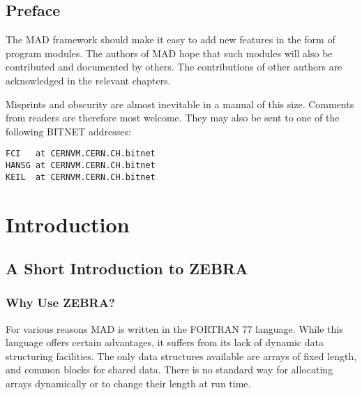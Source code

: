 
\chapter*{Preface}
 
The MAD framework should make it easy to add new features
in the form of program modules.
The authors of MAD hope that such modules will also be contributed
and documented by others.
The contributions of other authors are acknowledged in the relevant
chapters.
 
Misprints and obscurity are almost inevitable in a manual
of this size.
Comments from readers are therefore most welcome.
They may also be sent to one of the following BITNET addresses:
\begin{verbatim}
FCI   at CERNVM.CERN.CH.bitnet
HANSG at CERNVM.CERN.CH.bitnet
KEIL  at CERNVM.CERN.CH.bitnet
\end{verbatim}


\cleardoublepage
\tableofcontents
\listoffigures
\listoftables
\cleardoublepage
{}


\part{Introduction}


\chapter{A Short Introduction to ZEBRA}
\section{Why Use ZEBRA?}
For various reasons MAD \cite{MAD} is written in the FORTRAN 77 language.
While this language offers certain advantages,
it suffers from its lack of dynamic data structuring facilities.
The only data structures available are arrays of fixed length,
and common blocks for shared data.
There is no standard way for allocating arrays dynamically or to
change their length at run time.
 
